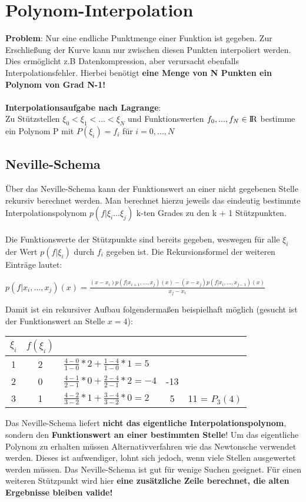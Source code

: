 \documentclass[10pt,a4paper]{article}
\def\realnumbers{{\rm I\!R}}
\begin{document}
	\section{Polynom-Interpolation}
	\textbf{Problem}: Nur eine endliche Punktmenge einer Funktion ist gegeben. Zur Erschließung der Kurve kann nur zwischen diesen Punkten interpoliert werden. Dies ermöglicht z.B Datenkompression, aber verursacht ebenfalls Interpolationsfehler. Hierbei benötigt \textbf{eine Menge von N Punkten ein Polynom von Grad N-1!}\\\\
	\textbf{Interpolationsaufgabe nach Lagrange}:\\
	Zu Stützstellen $\xi_0 < \xi_1 < ... < \xi_N$ und Funktionswerten $f_0, ..., f_N \in \realnumbers$ bestimme ein Polynom P mit $P(\xi_i) = f_i$ für $i = 0, ..., N$
	
	\subsection{Neville-Schema}
	Über das Neville-Schema kann der Funktionswert an einer nicht gegebenen Stelle rekursiv berechnet werden. Man berechnet hierzu jeweils das eindeutig bestimmte Interpolationspolynom $p(f|\xi_i ... \xi_j)$ k-ten Grades zu den k + 1 Stützpunkten.\\\\ Die Funktionswerte der Stützpunkte sind bereits gegeben, weswegen für alle $\xi_i$ der Wert $p(f|\xi_i)$ durch $f_i$ gegeben ist. Die Rekursionsformel der weiteren Einträge lautet:
	\begin{center}
		$p(f|x_i,...,x_j)(x) = \frac{(x - x_i) p(f|x_{i + 1},...,x_j)(x) - (x - x_j)p(f|x_i,...,x_{j-1})(x)}{x_j - x_i}$
	\end{center}
	Damit ist ein rekursiver Aufbau folgendermaßen beispielhaft möglich (gesucht ist der Funktionswert an Stelle $x = 4$):\\
	\begin{center}
		\begin{tabular}{c | c l c c}
			$\xi_i$ & $f(\xi_i)$ & & &\\
			\hline
			1 & 2 & $\frac{4 - 0}{1 - 0} * 2 + \frac{1 - 4}{1 - 0} * 1 = 5$ & &\\
			2 & 0 & $\frac{4 - 1}{2 - 1} * 0 + \frac{2 - 4}{2 - 1} * 2 = -4$ & -13 &\\
			3 & 1 & $\frac{4 - 2}{3 - 2} * 1 + \frac{3 - 4}{3 - 2} * 0 = 2$ & 5 & 11 = $P_3(4)$
		\end{tabular}
	\end{center}
	Das Neville-Schema liefert \textbf{nicht das eigentliche Interpolationspolynom}, sondern den \textbf{Funktionswert an einer bestimmten Stelle}! Um das eigentliche Polynom zu erhalten müssen Alternativverfahren wie das Newtonsche verwendet werden. Dieses ist aufwendiger, lohnt sich jedoch, wenn viele Stellen ausgewertet werden müssen. Das Neville-Schema ist gut für wenige Suchen geeignet. Für einen weiteren Stützpunkt wird hier \textbf{eine zusätzliche Zeile berechnet, die alten Ergebnisse bleiben valide!}
\end{document}
